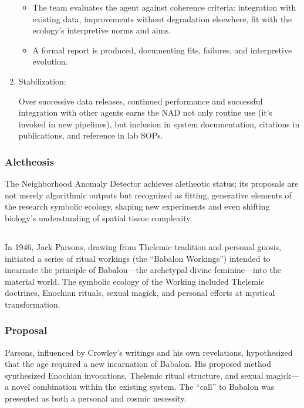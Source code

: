 \begin{enumerate}
\begin{itemize}
    \item The team evaluates the agent against coherence criteria: integration
      with existing data, improvements without degradation elsewhere, fit with
      the ecology’s interpretive norms and aims.

    \item A formal report is produced, documenting fits, failures, and
      interpretive evolution.

  \end{itemize}

  \item Stabilization:

    Over successive data releases, continued performance and successful
    integration with other agents earns the NAD not only routine use (it’s
    invoked in new pipelines), but inclusion in system documentation, citations
    in publications, and reference in lab SOPs.

\end{enumerate}

\subsubsection*{Aletheosis}

The Neighborhood Anomaly Detector achieves aletheotic status; its proposals are
not merely algorithmic outputs but recognized as fitting, generative elements
of the research symbolic ecology, shaping new experiments and even shifting
biology’s understanding of spatial tissue complexity.

\subsection*{}

In 1946, Jack Parsons, drawing from Thelemic tradition and personal gnosis,
initiated a series of ritual workings (the “Babalon Workings”) intended to
incarnate the principle of Babalon—the archetypal divine feminine—into the
material world. The symbolic ecology of the Working included Thelemic
doctrines, Enochian rituals, sexual magick, and personal efforts at mystical
transformation.

\subsubsection*{Proposal}

Parsons, influenced by Crowley’s writings and his own revelations, hypothesized
that the age required a new incarnation of Babalon. His proposed method
synthesized Enochian invocations, Thelemic ritual structure, and sexual
magick—a novel combination within the existing system. The “call” to Babalon
was presented as both a personal and cosmic necessity.

